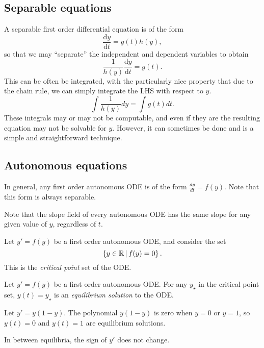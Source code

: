 \subsection{Separable equations}

A separable first order differential equation is of the form
\[\frac{\mathrm{d}y}{\mathrm{d}t} = g(t)h(y),\] so that we may ``separate'' the independent and dependent variables to obtain
\[\frac{1}{h(y)}\frac{\mathrm{d}y}{\mathrm{d}t} = g(t).\] This can be often be integrated, with the particularly nice property that due to the chain rule, we can simply integrate the LHS with respect to $y$.
\[\int \frac{1}{h(y)}dy = \int g(t)dt.\] These integrals may or may not be computable, and even if they are the resulting equation may not be solvable for $y$. However, it can sometimes be done and is a simple and straightforward technique.

\subsection{Autonomous equations}

In general, any first order autonomous ODE is of the form $\frac{dy}{dt} = f(y)$. Note that this form is always separable.

\begin{rmk}
    Note that the slope field of every autonomous ODE has the same slope for any given value of $y$, regardless of $t$.
\end{rmk}

\begin{defn}
    Let $y' = f(y)$ be a first order autonomous ODE, and consider the set
    \[\left\{y \in \mathbb{R} \,\middle|\, f(y) = 0 \right\}.\]
    This is the \emph{critical point} set of the ODE.
\end{defn}

\begin{defn}
    Let $y' = f(y)$ be a first order autonomous ODE. For any $y_{\star}$ in the critical point set, $y(t) = y_{\star}$ is an \emph{equilibrium solution} to the ODE.
\end{defn}

\begin{exmp}
    Let $y' = y(1-y)$. The polynomial $y(1-y)$ is zero when $y = 0$ or $y = 1$, so $y(t) = 0$ and $y(t) = 1$ are equilibrium solutions.
\end{exmp}

\begin{rmk}
    In between equilibria, the sign of $y'$ does not change.
\end{rmk}

